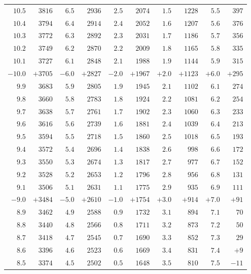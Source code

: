 \begin{center}
{{\begin{minipage}[t][500pt][t]{.96\linewidth}
{\begin{tabular}{r|r||r|r||r|r||r|r||r|r}
$10.5$ & $3816$ & $6.5$ & $2936$ & $2.5$ & $2074$ & $1.5$ & $1228$ & $5.5$ & $397$\\
$10.4$ & $3794$ & $6.4$ & $2914$ & $2.4$ & $2052$ & $1.6$ & $1207$ & $5.6$ & $376$\\
$10.3$ & $3772$ & $6.3$ & $2892$ & $2.3$ & $2031$ & $1.7$ & $1186$ & $5.7$ & $356$\\
$10.2$ & $3749$ & $6.2$ & $2870$ & $2.2$ & $2009$ & $1.8$ & $1165$ & $5.8$ & $335$\\
$10.1$ & $3727$ & $6.1$ & $2848$ & $2.1$ & $1988$ & $1.9$ & $1144$ & $5.9$ & $315$\\[4pt]
$-10.0$ & $+3705$ & $-6.0$ & $+2827$ & $-2.0$ & $+1967$ & $+2.0$ & $+1123$ & $+6.0$ & $+295$\\
$9.9$ & $3683$ & $5.9$ & $2805$ & $1.9$ & $1945$ & $2.1$ & $1102$ & $6.1$ & $274$\\
$9.8$ & $3660$ & $5.8$ & $2783$ & $1.8$ & $1924$ & $2.2$ & $1081$ & $6.2$ & $254$\\
$9.7$ & $3638$ & $5.7$ & $2761$ & $1.7$ & $1902$ & $2.3$ & $1060$ & $6.3$ & $233$\\
$9.6$ & $3616$ & $5.6$ & $2739$ & $1.6$ & $1881$ & $2.4$ & $1039$ & $6.4$ & $213$\\
$9.5$ & $3594$ & $5.5$ & $2718$ & $1.5$ & $1860$ & $2.5$ & $1018$ & $6.5$ & $193$\\
$9.4$ & $3572$ & $5.4$ & $2696$ & $1.4$ & $1838$ & $2.6$ & $998$ & $6.6$ & $172$\\
$9.3$ & $3550$ & $5.3$ & $2674$ & $1.3$ & $1817$ & $2.7$ & $977$ & $6.7$ & $152$\\
$9.2$ & $3528$ & $5.2$ & $2653$ & $1.2$ & $1796$ & $2.8$ & $956$ & $6.8$ & $131$\\
$9.1$ & $3506$ & $5.1$ & $2631$ & $1.1$ & $1775$ & $2.9$ & $935$ & $6.9$ & $111$\\[4pt]
$-9.0$ & $+3484$ & $-5.0$ & $+2610$ & $-1.0$ & $+1754$ & $+3.0$ & $+914$ & $+7.0$ & $+91$\\
$8.9$ & $3462$ & $4.9$ & $2588$ & $0.9$ & $1732$ & $3.1$ & $894$ & $7.1$ & $70$\\
$8.8$ & $3440$ & $4.8$ & $2566$ & $0.8$ & $1711$ & $3.2$ & $873$ & $7.2$ & $50$\\
$8.7$ & $3418$ & $4.7$ & $2545$ & $0.7$ & $1690$ & $3.3$ & $852$ & $7.3$ & $29$\\
$8.6$ & $3396$ & $4.6$ & $2523$ & $0.6$ & $1669$ & $3.4$ & $831$ & $7.4$ & $+9$\\
$8.5$ & $3374$ & $4.5$ & $2502$ & $0.5$ & $1648$ & $3.5$ & $810$ & $7.5$ & $-11$\\

\end{tabular}}
\end{minipage}}}
\end{center}
